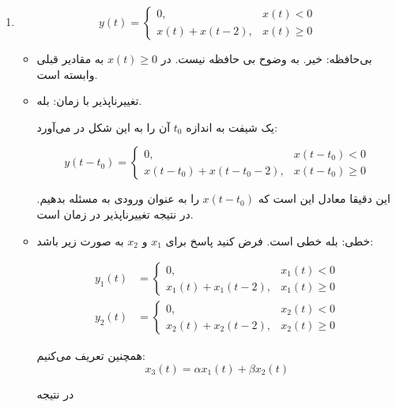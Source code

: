 \documentclass[12pt]{article}
\begin{document}
\begin{enumerate}[label = \harfi*)]
\begin{itemize}
	

\end{itemize}


\item
$$
y(t)=\left\{\begin{array}{ll}
	0, & x(t)<0 \\
	x(t)+x(t-2), & x(t) \geq 0
\end{array}\right.
$$


\begin{itemize}
	\item
	بی‌حافظه: خیر. به وضوح بی حافظه نیست.  در $x(t)\geq0$ به مقادیر قبلی وابسته است.
	\item
	تغییرناپذیر با زمان:  بله.
	
	 یک شیفت به اندازه $t_0$ آن را به این شکل در می‌آورد:
	 
	 $$
	 y\left(t-t_{0}\right)=\left\{\begin{array}{ll}
	 	0, & x\left(t-t_{0}\right)<0 \\
	 	x\left(t-t_{0}\right)+x\left(t-t_{0}-2\right), & x\left(t-t_{0}\right) \geq 0
	 \end{array}\right.
	 $$
	 
	 این دقیقا معادل این است که $x(t-t_0)$ را به عنوان ورودی به مسئله بدهیم. در نتیجه تغییرناپذیر در زمان است.
 
	\item
	خطی:  بله خطی است. فرض کنید پاسخ برای $x_1$ و $x_2$ به صورت زیر باشد:
	
	$$
	\begin{array}{ll}
		y_{1}(t) & =\left\{\begin{array}{ll}
			0, & x_{1}(t)<0 \\
			x_{1}(t)+x_{1}(t-2), & x_{1}(t) \geq 0
		\end{array}\right. \\
		y_{2}(t) & =\left\{\begin{array}{ll}
			0, & x_{2}(t)<0 \\
			x_{2}(t)+x_{2}(t-2), & x_{2}(t) \geq 0
		\end{array}\right.
	\end{array}
	$$
	
	همچنین تعریف می‌کنیم:
	$$x_3(t) = \alpha x_1(t) + \beta x_2(t)$$
	
	در نتیجه
	

\end{itemize}
\end{enumerate}
\end{document}
